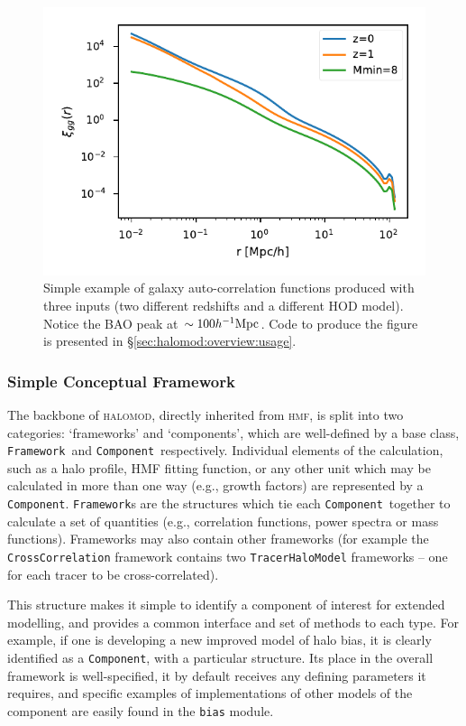 \documentclass[5p,aas_macros]{elsarticle}
\newcommand{\framework}{\texttt{Framework}}
\newcommand{\component}{\texttt{Component}}
\begin{document}
\begin{figure}
    \centering
    \includegraphics[width=\linewidth,trim={0 0.2cm 0 0},clip=true]{figures/toy_example.pdf}
    \caption{Simple example of galaxy auto-correlation functions produced with three inputs (two different redshifts and a different HOD model).
    Notice the BAO peak at $\sim100 h^{-1}{\rm Mpc}$. Code to produce the figure is presented in \S\ref{sec:halomod:overview:usage}.}
    \label{fig:toy_example}
\end{figure}

\subsubsection{Simple Conceptual Framework}
\label{sec:halomod:overview:concept}
The backbone of \textsc{halomod}, directly inherited from \textsc{hmf}, is split into two categories: `frameworks' and `components', which are well-defined by a base class, \framework\ and \component\ respectively. Individual elements of the calculation, such as a halo profile, HMF fitting function, or any other unit which may be calculated in more than one way (e.g., growth factors) are represented by a \component. \texttt{Framework}s are the structures which tie each \component\ together to calculate a set of quantities (e.g., correlation functions, power spectra or mass functions). Frameworks may also contain other frameworks (for example the \texttt{Cross\-Correlation} framework contains two \texttt{TracerHaloModel} frameworks -- one for each tracer to be cross-correlated).

This structure makes it simple to identify a component of interest for extended modelling, and provides a common interface and set of methods to each type. For example, if one is developing a new improved model of halo bias, it is clearly identified as a \component, with a particular structure. Its place in the overall framework is well-specified, it by default receives any defining parameters it requires, and specific examples of implementations of other models of the component are easily found in the \verb|bias| module. 
\end{document}
